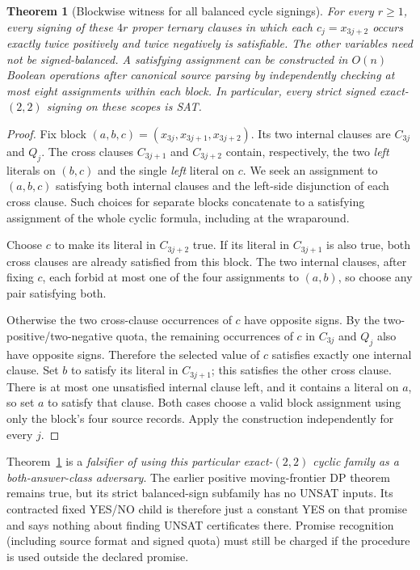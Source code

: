 \documentclass[11pt]{article}
\newtheorem{theorem}{Theorem}
\begin{document}
\begin{theorem}[Blockwise witness for all balanced cycle signings]\label{thm:all-yes}
For every $r\ge1$, every signing of these $4r$ proper ternary clauses in which each $c_j=x_{3j+2}$ occurs exactly twice positively and twice negatively is satisfiable. The other variables need not be signed-balanced. A satisfying assignment can be constructed in $O(n)$ Boolean operations after canonical source parsing by independently checking at most eight assignments within each block. In particular, \emph{every} strict signed exact-$(2,2)$ signing on these scopes is SAT.
\end{theorem}
\begin{proof}
Fix block $(a,b,c)=(x_{3j},x_{3j+1},x_{3j+2})$. Its two internal clauses are $C_{3j}$ and $Q_j$. The cross clauses $C_{3j+1}$ and $C_{3j+2}$ contain, respectively, the two \emph{left} literals on $(b,c)$ and the single \emph{left} literal on $c$. We seek an assignment to $(a,b,c)$ satisfying both internal clauses and the left-side disjunction of each cross clause. Such choices for separate blocks concatenate to a satisfying assignment of the whole cyclic formula, including at the wraparound.

Choose $c$ to make its literal in $C_{3j+2}$ true. If its literal in $C_{3j+1}$ is also true, both cross clauses are already satisfied from this block. The two internal clauses, after fixing $c$, each forbid at most one of the four assignments to $(a,b)$, so choose any pair satisfying both.

Otherwise the two cross-clause occurrences of $c$ have opposite signs. By the two-positive/two-negative quota, the remaining occurrences of $c$ in $C_{3j}$ and $Q_j$ also have opposite signs. Therefore the selected value of $c$ satisfies exactly one internal clause. Set $b$ to satisfy its literal in $C_{3j+1}$; this satisfies the other cross clause. There is at most one unsatisfied internal clause left, and it contains a literal on $a$, so set $a$ to satisfy that clause. Both cases choose a valid block assignment using only the block's four source records. Apply the construction independently for every $j$.
\end{proof}

Theorem~\ref{thm:all-yes} is a \emph{falsifier of using this particular exact-$(2,2)$ cyclic family as a both-answer-class adversary}. The earlier positive moving-frontier DP theorem remains true, but its strict balanced-sign subfamily has no UNSAT inputs. Its contracted fixed YES/NO child is therefore just a constant YES on that promise and says nothing about finding UNSAT certificates there. Promise recognition (including source format and signed quota) must still be charged if the procedure is used outside the declared promise.
\end{document}
